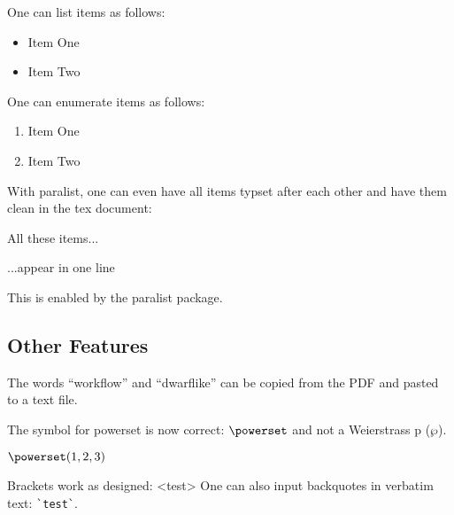 \documentclass[runningheads,a4paper,english]{llncs}[2022/01/12]
\begin{document}
One can list items as follows:

\begin{ltgexample}
\begin{itemize}
\item Item One
\item Item Two
\end{itemize}
\end{ltgexample}


One can enumerate items as follows:

\begin{ltgexample}
\begin{enumerate}
  \item Item One
  \item Item Two
\end{enumerate}
\end{ltgexample}


With paralist, one can even have all items typset after each other and have them clean in the tex document:

\begin{ltgexample}
\begin{inparaenum}
  \item All these items...
  \item ...appear in one line
  \item This is enabled by the paralist package.
\end{inparaenum}
\end{ltgexample}

\subsection{Other Features}

\begin{ltgexample}
The words \enquote{workflow} and \enquote{dwarflike} can be copied from the PDF and pasted to a text file.
\end{ltgexample}

\begin{ltgexample}
The symbol for powerset is now correct: $\powerset$ and not a Weierstrass p ($\wp$).

$\powerset({1,2,3})$
\end{ltgexample}

\begin{ltgexample}
Brackets work as designed:
<test>
One can also input backquotes in verbatim text: \verb|`test`|.
\end{ltgexample}
\end{document}
